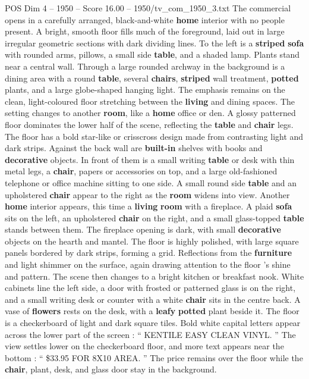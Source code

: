 \begin{textsample}{POS Dim 4 – 1950 – Score 16.00 – 1950/tv\_com\_1950\_3.txt}  \label{ex:f4_pos_034}
The commercial opens in a carefully arranged, black-and-white \textbf{home} interior with no people present.
A bright, smooth floor fills much of the foreground, laid out in large irregular geometric sections with dark dividing lines.
To the left is a \textbf{striped} \textbf{sofa} with rounded arms, pillows, a small side \textbf{table}, and a shaded lamp.
Plants stand near a central wall.
Through a large rounded archway in the background is a dining area with a round \textbf{table}, several \textbf{chairs}, \textbf{striped} wall treatment, \textbf{potted} plants, and a large globe-shaped hanging light.
The emphasis remains on the clean, light-coloured floor stretching between the \textbf{living} and dining spaces.
The setting changes to another \textbf{room}, like a \textbf{home} office or den.
A glossy patterned floor dominates the lower half of the scene, reflecting the \textbf{table} and \textbf{chair} legs.
The floor has a bold star-like or crisscross design made from contrasting light and dark strips.
Against the back wall are \textbf{built-in} shelves with books and \textbf{decorative} objects.
In front of them is a small writing \textbf{table} or desk with thin metal legs, a \textbf{chair}, papers or accessories on top, and a large old-fashioned telephone or office machine sitting to one side.
A small round side \textbf{table} and an upholstered \textbf{chair} appear to the right as the \textbf{room} widens into view.
Another \textbf{home} interior appears, this time a \textbf{living} \textbf{room} with a fireplace.
A plaid \textbf{sofa} sits on the left, an upholstered \textbf{chair} on the right, and a small glass-topped \textbf{table} stands between them.
The fireplace opening is dark, with small \textbf{decorative} objects on the hearth and mantel.
The floor is highly polished, with large square panels bordered by dark strips, forming a grid.
Reflections from the \textbf{furniture} and light shimmer on the surface, again drawing attention to the floor ’s shine and pattern.
The scene then changes to a bright kitchen or breakfast nook.
White cabinets line the left side, a door with frosted or patterned glass is on the right, and a small writing desk or counter with a white \textbf{chair} sits in the centre back.
A vase of \textbf{flowers} rests on the desk, with a \textbf{leafy} \textbf{potted} plant beside it.
The floor is a checkerboard of light and dark square tiles.
Bold white capital letters appear across the lower part of the screen : “ KENTILE EASY CLEAN VINYL. ” The view settles lower on the checkerboard floor, and more text appears near the bottom : “ \$33.95 FOR 8X10 AREA. ” The price remains over the floor while the \textbf{chair}, plant, desk, and glass door stay in the background.

\end{textsample}
